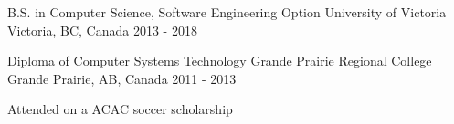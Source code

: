 


\begin{cventries}


\cventry
{B.S. in Computer Science, Software Engineering Option} %
{University of Victoria} %
{Victoria, BC, Canada} %
{2013 - 2018} %
{ %
\begin{cvitems}
\end{cvitems}
}

\cventry
{Diploma of Computer Systems Technology} %
{Grande Prairie Regional College} %
{Grande Prairie, AB, Canada} %
{2011 - 2013} %
{ %
\begin{cvitems}
\item {Attended on a ACAC soccer scholarship}
\end{cvitems}
}



\end{cventries}